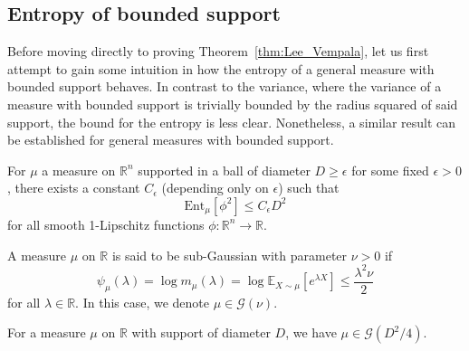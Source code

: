
\subsection{Entropy of bounded support}

Before moving directly to proving Theorem~\ref{thm:Lee_Vempala}, let us first attempt to gain some intuition 
in how the entropy of a general measure with bounded support behaves. In contrast to the variance, 
where the variance of a measure with bounded support is trivially bounded by the radius squared of 
said support, the bound for the entropy is less clear. Nonetheless, a similar result can be established 
for general measures with bounded support.


\begin{lemma}\label{lem:entropy_supp2}
  For \(\mu\) a measure on \(\mathbb{R}^n\) supported in a ball of diameter \(D \ge \epsilon\) for some fixed \(\epsilon > 0\), 
  there exists a constant \(C_\epsilon\) (depending only on \(\epsilon\)) such that 
  \[\text{Ent}_\mu[\phi^2] \le C_\epsilon D^2\]
  for all smooth 1-Lipschitz functions \(\phi : \mathbb{R}^n \to \mathbb{R}\).
\end{lemma}

\begin{definition}
  A measure \(\mu\) on \(\mathbb{R}\) is said to be sub-Gaussian with parameter \(\nu > 0\) if 
  \[\psi_\mu(\lambda) = \log m_{\mu}(\lambda) = \log \mathbb{E}_{X \sim \mu}[e^{\lambda X}] \le \frac{\lambda^2\nu}{2}\]
  for all \(\lambda \in \mathbb{R}\). In this case, we denote \(\mu \in \mathcal{G}(\nu)\).
\end{definition}

\begin{lemma}
  For a measure \(\mu\) on \(\mathbb{R}\) with support of diameter \(D\), we have \(\mu \in \mathcal{G}(D^2 / 4)\).
\end{lemma}


